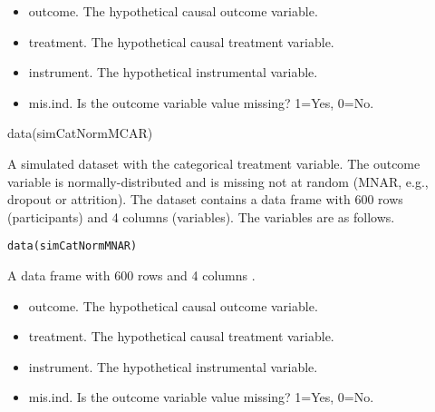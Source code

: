 \documentclass[a4paper]{book}
\begin{document}
%
\begin{Details}\relax
\begin{itemize}

\item outcome. The hypothetical causal outcome variable.
\item treatment. The hypothetical causal treatment variable.
\item instrument. The hypothetical instrumental variable.
\item mis.ind. Is the outcome variable value missing? 1=Yes, 0=No.

\end{itemize}

\end{Details}
%
\begin{Examples}
\begin{ExampleCode}

data(simCatNormMCAR)


\end{ExampleCode}
\end{Examples}
%
\begin{Description}\relax
A simulated dataset with the categorical treatment variable. The outcome variable
is normally-distributed and is missing not at random (MNAR, e.g., dropout or attrition).
The dataset contains a data frame with 600 rows (participants) and 4 columns (variables).
The variables are as follows.
\end{Description}
%
\begin{Usage}
\begin{verbatim}
data(simCatNormMNAR)
\end{verbatim}
\end{Usage}
%
\begin{Format}
A data frame with 600 rows and 4 columns .
\end{Format}
%
\begin{Details}\relax
\begin{itemize}

\item outcome. The hypothetical causal outcome variable.
\item treatment. The hypothetical causal treatment variable.
\item instrument. The hypothetical instrumental variable.
\item mis.ind. Is the outcome variable value missing? 1=Yes, 0=No.

\end{itemize}

\end{Details}
\end{document}
